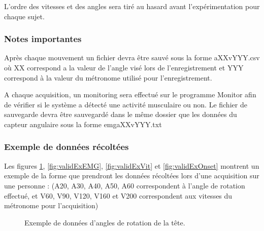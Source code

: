 \documentclass[letterpaper, twoside, 12pt, memoire, creativecommons, hyperref]{thETS}
\begin{document}
L’ordre des vitesses et des angles sera tiré au hasard avant l’expérimentation pour chaque sujet.

\subsubsection{Notes importantes}

Après chaque mouvement un fichier devra être sauvé sous la forme aXXvYYY.csv où XX correspond a la valeur de l’angle visé lors de l’enregistrement et YYY correspond à la valeur du métronome utilisé pour l’enregistrement.

A chaque acquisition, un monitoring sera effectué sur le programme Monitor afin de vérifier si le système a détecté une activité musculaire ou non. Le fichier de sauvegarde devra être sauvegardé dans le même dossier que les données du capteur angulaire sous la forme emgaXXvYYY.txt

\subsubsection{Exemple de données récoltées}

Les figures \ref{fig:validExAng}, \ref{fig:validExEMG}, \ref{fig:validExVit} et \ref{fig:validExOnset} montrent un exemple de la forme que prendront les données récoltées lors d’une acquisition sur une personne : (A20, A30, A40, A50, A60 correspondent à l’angle de rotation effectué, et V60, V90, V120, V160 et V200 correspondent aux vitesses du métronome pour l’acquisition)

\begin{figure}
	\centering
	\caption{Exemple de données d'angles de rotation de la tête.}
	\label{fig:validExAng}
\end{figure}
\end{document}
